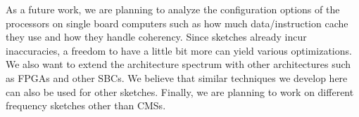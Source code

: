 \documentclass[10pt, review=true,sigconf]{acmart}
\begin{document}
As a future work, we are planning to analyze the configuration options of the processors on single board computers such as how much data/instruction cache they use and how they handle coherency. Since sketches already incur inaccuracies, a freedom to have a little bit more can yield various optimizations. We also want to extend the architecture spectrum with other architectures such as FPGAs and other SBCs. We believe that similar techniques we develop here can also be used for other sketches. Finally, we are planning to work on different frequency sketches other than CMSs.




    
\end{document}

